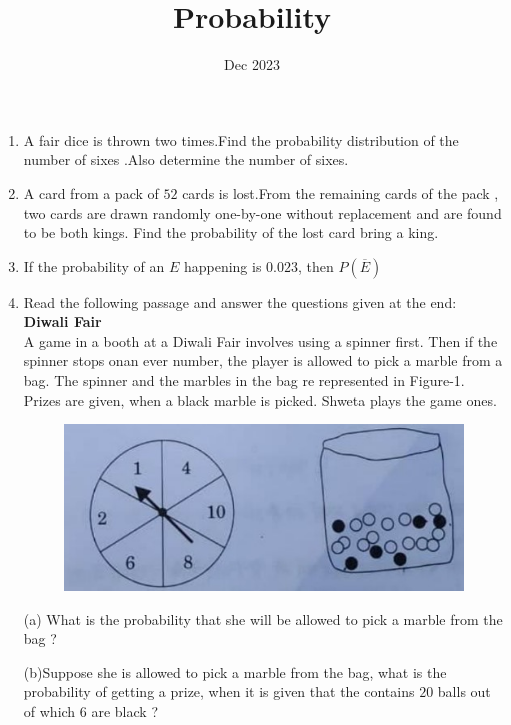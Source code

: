 \documentclass[12pt,-letter paper]{article}
\title{Probability}
\date{Dec 2023}
\begin{document}
\maketitle
\begin{enumerate}

\item A fair dice is thrown two times.Find the probability distribution of the number of sixes .Also determine the number of sixes.

\item A card from a pack of $52$ cards is lost.From the remaining cards of the pack , two cards are drawn randomly one-by-one without replacement and are found to be both kings. Find the probability of the lost card bring a king.

\item If the probability of an $E$ happening is $0.023$, then $P(\overline{E})$

\item Read the following passage and answer the questions given at the end:\\
\textbf{Diwali Fair}\\
A game in a booth at a Diwali Fair involves using a spinner first. Then if the spinner stops onan ever number, the player is allowed to pick a marble from a bag. The spinner and the marbles in the bag re represented in Figure-1.
Prizes are given, when a black marble is picked. Shweta plays the game ones.

		\begin{figure}[H]
			\centering
			\includegraphics[width=0.5\columnwidth]{figs/Probability.jpg}
			\caption{}
		\end{figure}

(a) What is the probability that she will be allowed to pick a marble from the bag ?

(b)Suppose she is allowed to pick a marble from the bag, what is the probability of getting a prize, when it is given that the contains $20$ balls out of which $6$ are black ?
\end{enumerate}
\end{document}
